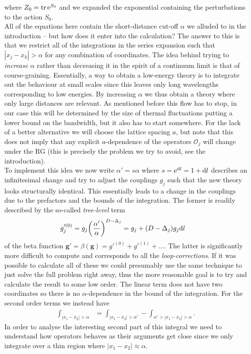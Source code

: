 \documentclass[english, parskip=full]{scrartcl}
\begin{document}
where $Z_0=\tr \text{e}^{S_0}$ and we expanded the exponential containing the perturbations to the action $S_0$.\\
All of the equations here contain the short-distance cut-off $\alpha$ we alluded to in the introduction -- but how does it enter into the calculation?
The answer to this is that we restrict all of the integrations in the series expansion such that $|x_j - x_k| > \alpha$ for any combination of coordinates.
The idea behind trying to \emph{increase} $\alpha$ rather than decreasing it in the spirit of a continuum limit is that of course-graining.
Essentially, a way to obtain a low-energy theory is to integrate out the behaviour at small scales since this leaves only long wavelengths corresponding to low energies.
By increasing $\alpha$ we thus obtain a theory where only large distances are relevant.
As mentioned before this flow has to stop, in our case this will be determined by the size of thermal fluctuations putting a lower bound on the bandwidth, but it also has to start somewhere.
For the lack of a better alternative we will choose the lattice spacing $a$, but note that this does not imply that any explicit $a$-dependence of the operators $\mathcal{O}_j$ will change under the RG (this is precisely the problem we try to avoid, see the introduction).\\
To implement this idea we now write $\alpha'=s\alpha$ where $s=\text{e}^{\text{d} l} = 1 + \text{d} l$ describes an infinitesimal change and try to adjust the couplings $g_j$ such that the new theory looks structurally identical.
This essentially leads to a change in the couplings due to the prefactors and the bounds of the integration.
The former is readily described by the so-called \emph{tree-level} term
\begin{align}
g_j'^{(0)} &= g_j \kla*{\frac{\alpha'}{\alpha}}^{D-\Delta_{j}} = g_j + (D-\Delta_{j}) g_j \d l
\end{align}
of the beta function $\textbf{g}'=\beta(\textbf{g}) = g'^{(0)} + g'^{(1)} + \dots$.
The latter is significantly more difficult to compute and corresponds to all the \emph{loop-corrections}.
If it was possible to calculate all of these we could presumably use the same technique to just solve the full problem right away, thus the more reasonable goal is to try and calculate the result to some low order.
The linear term does not have two coordinates so there is no $\alpha$-dependence in the bound of the integration.
For the second order terms we instead have
\begin{align}
\int_{|x_1-x_2|>\alpha} &= \int_{|x_1-x_2|>\alpha'} - \int_{\alpha' > |x_1-x_2| > \alpha}.
\end{align}
In order to analyse the interesting second part of this integral we need to understand how operators behaves as their arguments get close since we only integrate over a thin region where $|x_1-x_2|\approx \alpha$.
\end{document}
